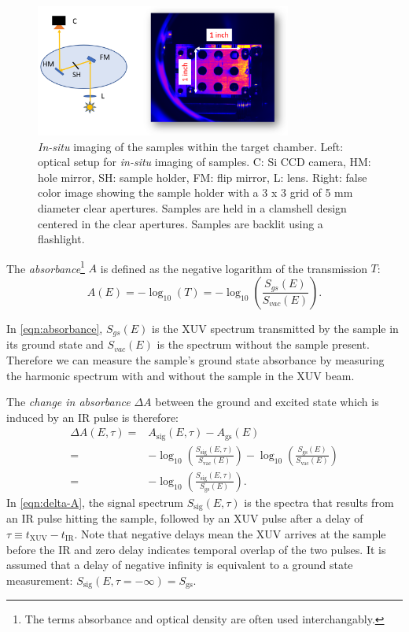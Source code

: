 \begin{figure}
	\centering
	\includegraphics[width=0.75\textwidth]{figures/chap3/sample_holder.png}
	\caption{\textit{In-situ} imaging of the samples within the target chamber. Left: optical setup for \textit{in-situ} imaging of samples. C: Si CCD camera, HM: hole mirror, SH: sample holder, FM: flip mirror, L: lens. Right: false color image showing the sample holder with a 3 x 3 grid of 5 mm diameter clear apertures. Samples are held in a clamshell design centered in the clear apertures. Samples are backlit using a flashlight.}
	\label{fig:sample_holder}
\end{figure}

The \textit{absorbance}\footnote{The terms absorbance and optical density are often used interchangably.} $A$ is defined as the negative logarithm of the transmission $T$:
\begin{equation}
A(E) = -\log_{10} \left( T \right) = -\log_{10} \left(\frac{S_{gs}(E)}{S_{vac}(E)} \right).
\label{eqn:absorbance}
\end{equation}

In \cref{eqn:absorbance}, $S_{gs}(E)$ is the XUV spectrum transmitted by the sample in its ground state and $S_{vac}(E)$ is the spectrum without the sample present. Therefore we can measure the sample's ground state absorbance by measuring the harmonic spectrum with and without the sample in the XUV beam.

The \textit{change in absorbance} $\Delta A$ between the ground and excited state which is induced by an IR pulse is therefore:
\begin{equation}
\begin{aligned}
\Delta A(E,\tau) = & A_{\text{sig}}(E,\tau) - A_{\text{gs}}(E) \\
= & -\log_{10} \left(\frac{S_{\text{sig}}(E,\tau)}{S_{\text{vac}}(E)} \right) -  \log_{10} \left(\frac{S_{\text{gs}}(E)}{S_{\text{vac}}(E)} \right) \\
= & -\log_{10} \left(\frac{S_{\text{sig}}(E,\tau)}{S_{\text{gs}}(E)} \right).
\end{aligned}
\label{eqn:delta-A}
\end{equation}
In \cref{eqn:delta-A}, the signal spectrum $S_{\text{sig}}(E,\tau)$ is the spectra that results from an IR pulse hitting the sample, followed by an XUV pulse after a delay of $\tau \equiv t_{\text{XUV}} - t_{\text{IR}}$. Note that negative delays mean the XUV arrives at the sample before the IR and zero delay indicates temporal overlap of the two pulses. It is assumed that a delay of negative infinity is equivalent to a ground state measurement: $S_{\text{sig}}(E,\tau=-\infty) = S_{\text{gs}}$.

